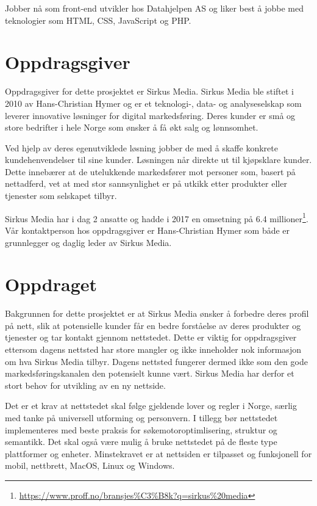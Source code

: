 Jobber nå som front-end utvikler hos Datahjelpen AS og liker best å jobbe med teknologier som HTML, CSS, JavaScript og PHP.

\section{Oppdragsgiver}
Oppdragsgiver for dette prosjektet er Sirkus Media.
Sirkus Media ble stiftet i 2010 av Hans-Christian Hymer og er et teknologi-, data- og analyseselskap som leverer innovative løsninger for digital markedsføring. Deres kunder er små og store bedrifter i hele Norge som ønsker å få økt salg og lønnsomhet. 

Ved hjelp av deres egenutviklede løsning jobber de med å skaffe konkrete kundehenvendelser til sine kunder. Løsningen når direkte ut til kjøpsklare kunder. Dette innebærer at de utelukkende markedsfører mot personer som, basert på nettadferd, vet at med stor sannsynlighet er på utkikk etter produkter eller tjenester som selskapet tilbyr.

Sirkus Media har i dag 2 ansatte og hadde i 2017 en omsetning på 6.4 millioner\footnote{\url{https://www.proff.no/bransjes\%C3\%B8k?q=sirkus\%20media}}.
Vår kontaktperson hos oppdragsgiver er Hans-Christian Hymer som både er grunnlegger og daglig leder av Sirkus Media. 

\section{Oppdraget}
\label{sec:oppgaven}
Bakgrunnen for dette prosjektet er at Sirkus Media ønsker å forbedre deres profil på nett, slik at potensielle kunder får en bedre forståelse av deres produkter og tjenester og tar kontakt gjennom nettstedet. Dette er viktig for oppdragsgiver ettersom dagens nettsted har store mangler og ikke inneholder nok informasjon om hva Sirkus Media tilbyr. Dagens nettsted fungerer dermed ikke som den gode markedsføringskanalen den potensielt kunne vært. Sirkus Media har derfor et stort behov for utvikling av en ny nettside. 

Det er et krav at nettstedet skal følge gjeldende lover og regler i Norge, særlig med tanke på universell utforming og personvern. I tillegg bør nettstedet implementeres med beste praksis for søkemotoroptimlisering, struktur og semantikk. Det skal også være mulig å bruke nettstedet på de fleste type plattformer og enheter. Minstekravet er at nettsiden er tilpasset og funksjonell for mobil, nettbrett, MacOS, Linux og Windows.

